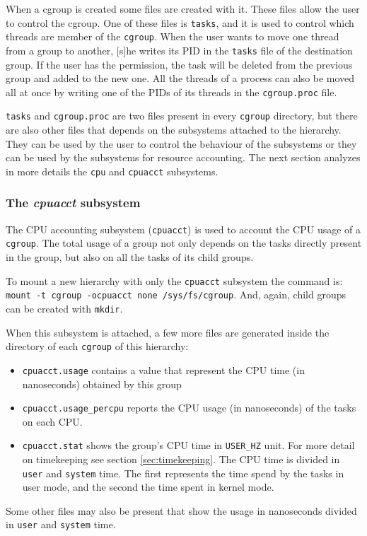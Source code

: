 When a cgroup is created some files are created with it. These files allow the user to control the cgroup. One of these files is \verb|tasks|, and it is used to control which threads are member of the \verb|cgroup|. When the user wants to move one thread from a group to another, [s]he writes its PID in the \verb|tasks| file of the destination group. If the user has the permission, the task will be deleted from the previous group and added to the new one. All the threads of a process can also be moved all at once by writing one of the PIDs of its threads in the \verb|cgroup.proc| file. 

\verb|tasks| and \verb|cgroup.proc| are two files present in every \verb|cgroup| directory, but there are also other files that depends on the subsystems attached to the hierarchy. They can be used by the user to control the behaviour of the subsystems or they can be used by the subsystems for resource accounting.  The next section analyzes in more details the \verb|cpu| and \verb|cpuacct| subsystems.

\subsubsection{The \textit{cpuacct} subsystem}

The CPU accounting subsystem (\verb|cpuacct|) is used to account the CPU usage of a \verb|cgroup|. The total usage of a group not only depends on the tasks directly present in the group, but also on all the tasks of its child groups.

To mount a new hierarchy with only the \verb|cpuacct| subsystem the command is: \verb|mount -t cgroup -ocpuacct none /sys/fs/cgroup|. And, again, child groups can be created with \verb|mkdir|.

When this subsystem is attached, a few more files are generated inside the directory of each \verb|cgroup| of this hierarchy:
\begin{itemize}
    \item \verb|cpuacct.usage| contains a value that represent the CPU time (in nanoseconds) obtained  by this group
    \item \verb|cpuacct.usage_percpu| reports the CPU usage (in nanoseconds) of the tasks on each CPU.
    \item \verb|cpuacct.stat| shows the group's CPU time in \verb|USER_HZ| unit. For more detail on timekeeping see section \ref{sec:timekeeping}. The CPU time is divided in \verb|user| and \verb|system| time. The first represents the time spend by the tasks in user mode, and the second the time spent in kernel mode.
\end{itemize}
Some other files may also be present that show the usage in nanoseconds divided in \verb|user| and \verb|system| time.


